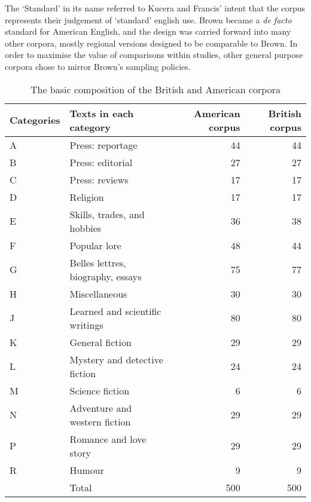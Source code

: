 The `Standard' in its name referred to Kucera and Francis' intent that the corpus represents their judgement of `standard' english use.  Brown became a \textsl{de facto} standard for American English, and the design was carried forward into many other corpora, mostly regional versions designed to be comparable to Brown\cite{hundt1999manual,johansson1986tagged,hundt1998manual,shastri1988kolhapur,collins1988australian,bauer1993manual,mcenery2004lancaster}.  In order to maximise the value of comparisons within studies, other general purpose corpora chose to mirror Brown's sampling policies.


\begin{table}[Ht]
    \centering

    \begin{tabular}{llrr}
    \hline
    Categories & Texts in each category & American corpus & British corpus \\ \hline
    A & Press: reportage & 44 & 44 \\
    B & Press: editorial & 27 & 27 \\
    C & Press: reviews & 17 & 17 \\
    D & Religion & 17 & 17 \\
    E & Skills, trades, and hobbies & 36 & 38 \\
    F & Popular lore & 48 & 44 \\
    G & Belles lettres, biography, essays & 75 & 77 \\
    H & Miscellaneous & 30 & 30 \\
    J & Learned and scientific writings & 80 & 80 \\
    K & General fiction & 29 & 29 \\
    L & Mystery and detective fiction & 24 & 24 \\
    M & Science fiction & 6 & 6 \\
    N & Adventure and western fiction & 29 & 29 \\
    P & Romance and love story & 29 & 29 \\
    R & Humour & 9 & 9 \\ \hline
      & Total & 500 & 500 \\ \hline
    \end{tabular}

    \caption{The basic composition of the British and American corpora}
    \label{table:litreview:corpora:lobdist}
\end{table}


